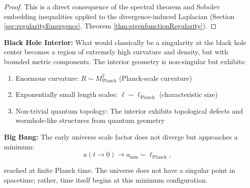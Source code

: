 \begin{theorem}
\begin{theorem}
\begin{proof}

This is a direct consequence of the spectral theorem and Sobolev embedding inequalities applied to the divergence-induced Laplacian (Section \ref{sec:regularityEmergence}, Theorem \ref{thm:eigenfunctionRegularity}).

\end{proof}

\end{theorem}

\begin{remark}

\textbf{Black Hole Interior:} What would classically be a singularity at the black hole center becomes a region of extremely high curvature and density, but with bounded metric components. The interior geometry is non-singular but exhibits:
\begin{enumerate}
\item Enormous curvature: $R \sim M_{\text{Planck}}^2$ (Planck-scale curvature)
\item Exponentially small length scales: $\ell \sim \ell_{\text{Planck}}$ (characteristic size)
\item Non-trivial quantum topology: The interior exhibits topological defects and wormhole-like structures from quantum geometry
\end{enumerate}

\textbf{Big Bang:} The early universe scale factor does not diverge but approaches a minimum:
\begin{equation}
a(t \to 0) \to a_{\min} \sim \ell_{\text{Planck}},
\end{equation}

reached at finite Planck time. The universe does not have a singular point in spacetime; rather, time itself begins at this minimum configuration.

\end{remark}

\end{theorem}

